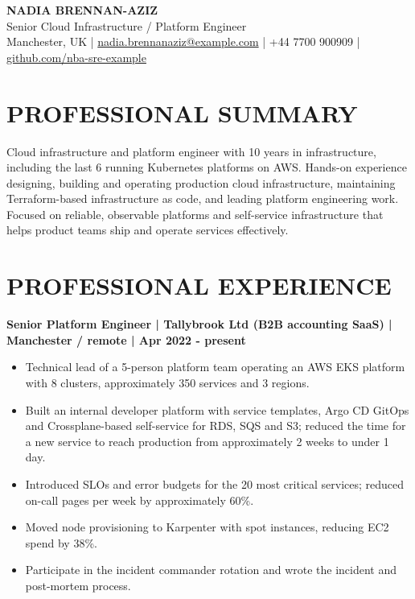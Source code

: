 \documentclass[11pt,a4paper]{article}
\begin{document}
\begin{center}
{\Huge\bfseries\color{primarycolor} NADIA BRENNAN-AZIZ}\\[0.35em]
{\large\color{accentcolor} Senior Cloud Infrastructure / Platform Engineer}\\[0.3em]
Manchester, UK | \href{mailto:nadia.brennanaziz@example.com}{nadia.brennanaziz@example.com} | +44 7700 900909 | \href{https://github.com/nba-sre-example}{github.com/nba-sre-example}
\end{center}

\section*{PROFESSIONAL SUMMARY}
Cloud infrastructure and platform engineer with 10 years in infrastructure, including the last 6 running Kubernetes platforms on AWS. Hands-on experience designing, building and operating production cloud infrastructure, maintaining Terraform-based infrastructure as code, and leading platform engineering work. Focused on reliable, observable platforms and self-service infrastructure that helps product teams ship and operate services effectively.

\section*{PROFESSIONAL EXPERIENCE}
\textbf{Senior Platform Engineer | Tallybrook Ltd (B2B accounting SaaS) | Manchester / remote | Apr 2022 - present}
\begin{itemize}
\item Technical lead of a 5-person platform team operating an AWS EKS platform with 8 clusters, approximately 350 services and 3 regions.
\item Built an internal developer platform with service templates, Argo CD GitOps and Crossplane-based self-service for RDS, SQS and S3; reduced the time for a new service to reach production from approximately 2 weeks to under 1 day.
\item Introduced SLOs and error budgets for the 20 most critical services; reduced on-call pages per week by approximately 60\%.
\item Moved node provisioning to Karpenter with spot instances, reducing EC2 spend by 38\%.
\item Participate in the incident commander rotation and wrote the incident and post-mortem process.
\end{itemize}
\end{document}
